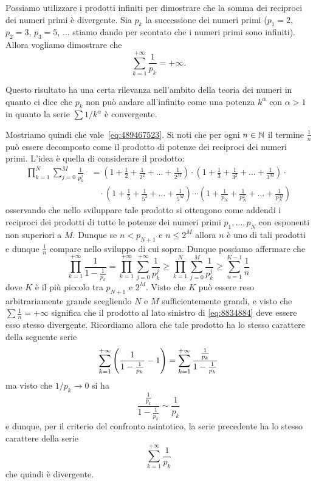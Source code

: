 \begin{example}
%
%
Possiamo utilizzare i prodotti infiniti per dimostrare che la somma
dei reciproci dei numeri primi è divergente.
Sia $p_k$ la successione dei numeri
primi ($p_1=2$, $p_2=3$, $p_3=5$, $\dots$ stiamo dando per scontato che i numeri
primi sono infiniti). Allora vogliamo dimostrare che
\begin{equation}\label{eq:489467523}
  \sum_{k=1}^{+\infty} \frac{1}{p_k} = +\infty.
\end{equation}

Questo risultato ha una certa rilevanza nell'ambito della teoria dei numeri
in quanto ci dice che $p_k$ non può andare all'infinito come una
potenza $k^\alpha$ con $\alpha>1$ in quanto la serie $\sum 1/k^\alpha$
è convergente.

Mostriamo quindi che vale~\eqref{eq:489467523}.
Si noti che per ogni $n\in {\mathbb N}$ il termine $\frac 1 n$
può essere decomposto come il prodotto di
potenze dei reciproci dei numeri primi. 
L'idea è quella di considerare il prodotto:
\begin{align*}
  \prod_{k=1}^{N} \sum_{j=0}^{M} \frac{1}{p_k^j}
  &= 
  (1 + \frac 1 2 + \frac 1 {2^2} + \dots + \frac{1}{2^M}) \cdot
  (1 + \frac 1 3 + \frac 1 {3^2} + \dots + \frac{1}{3^M}) \cdot \\
  &\quad \cdot(1 + \frac 1 5 + \frac 1 {5^2} + \dots + \frac{1}{5^M}) \cdots
  (1 + \frac 1 {p_N} + \frac 1 {p_N^2} + \dots + \frac{1}{p_N^M})
\end{align*}
osservando che nello sviluppare tale prodotto si ottengono 
come addendi i reciproci dei prodotti di tutte le potenze dei numeri primi
$p_1,\dots, p_N$ con esponenti non superiori a $M$.
Dunque se $n < p_{N+1}$ e $n \le 2^M$ 
allora $n$ è uno di tali prodotti e dunque $\frac 1 n$ 
compare nello sviluppo di cui sopra.
Dunque possiamo affermare che 
\begin{equation}\label{eq:8834884}
  \prod_{k=1}^{+\infty} \frac{1}{1-\frac{1}{p_k}}
  = \prod_{k=1}^{+\infty} \sum_{j=0}^{+\infty} \frac{1}{p_k^j}
  \ge \prod_{k=1}^{N} \sum_{j=0}^{M} \frac{1}{p_k^j}
  \ge \sum_{n=1}^{K-1} \frac 1 n
\end{equation}
dove $K$ è il più piccolo tra $p_{N+1}$ e $2^M$. 
Visto che $K$ può essere reso arbitrariamente grande 
scegliendo $N$ e $M$ sufficientemente grandi, 
e visto che $\sum \frac 1 n =+\infty$ significa che il prodotto
al lato sinistro di \eqref{eq:8834884} deve essere 
esso stesso divergente.
Ricordiamo allora che tale prodotto ha lo stesso carattere
della seguente serie
\[
  \sum_{k=1}^{+\infty} {\left( \frac{1}{1-\frac 1 {p_k}}-1 \right)}
  = \sum_{k=1}^{+\infty} \frac{\frac 1 {p_k}}{1-\frac{1}{p_k}}
\]
ma visto che $1/p_k\to 0$ si ha
\[
  \frac{\frac 1 {p_k}}{1-\frac{1}{p_k}}
  \sim \frac 1 {p_k}
\]
e dunque, per il criterio del confronto asintotico, la serie precedente ha
lo stesso carattere della serie
\[
\sum_{k=1}^{+\infty} \frac{1}{p_k}
\]
che quindi è divergente.
\end{example}

